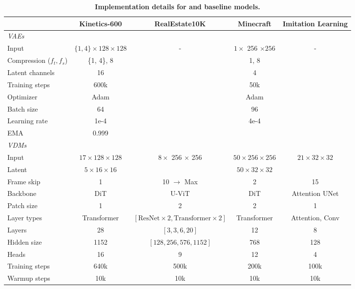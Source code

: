 \newcommand{\none}{\ding{55}}
\begin{table}[t]
    \caption{
        \textbf{Implementation details for \mtd and baseline models.}
    }
    \label{tab:training_details}
    \vskip 0.1in
    \centering
    \begin{adjustbox}{max width=\linewidth}
    \begin{tabular}{l c c c c}
    \toprule
    & Kinetics-600 & RealEstate10K & Minecraft & Imitation Learning \\
    \midrule
    \emph{VAEs} \\
    Input & $\{1, 4\} \times 128 \times 128$ & \multirow{8}{*}{-} & $1 \times$ 256 $\times 256$ & \multirow{8}{*}{-} \\
    \quad Compression ($f_t, f_s$) & \{1, 4\}, 8 & & 1, 8 \\
    \quad Latent channels & 16 & & 4 \\
    Training steps & 600k & & 50k \\
    \quad Optimizer & Adam & & Adam \\
    \quad Batch size & 64 & & 96 \\
    \quad Learning rate & 1e-4 & & 4e-4\\
    \quad EMA & 0.999 & & \none \\
    \midrule
    \emph{VDMs} \\
    Input & $17 \times 128 \times 128$ & $8 \times$ 256 $\times$ 256 & $50 \times 256 \times 256$ & $21\times 32 \times 32$ \\
    \quad Latent & $5 \times 16 \times 16$ & \none & $50 \times 32 \times 32$ & \none \\
    \quad Frame skip & 1 & 10 $\rightarrow$ Max & 2 & 15 \\
    Backbone & DiT & U-ViT & DiT & Attention UNet\\
    \quad Patch size & 1 & 2 & 2 & 1 \\
    \quad Layer types & Transformer & $\left[\text{ResNet}\times2, \text{Transformer}\times2\right]$ & Transformer & Attention, Conv \\
    \quad Layers & 28 & $\left[3, 3, 6, 20\right]$ & 12 & 8 \\
    \quad Hidden size & 1152 & $\left[128, 256, 576, 1152\right]$ & 768 & 128 \\
    \quad Heads & 16 & 9 & 12 & 4 \\
    Training steps & 640k & 500k & 200k & 100k \\
    \quad Warmup steps & 10k & 10k & 10k & 10k \\

\end{tabular}
\end{adjustbox}
\end{table}
